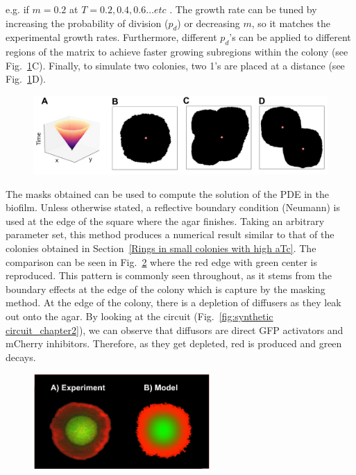 e.g. if $m=0.2$ at $T=0.2, 0.4, 0.6 \ldots etc$ .
The growth rate can be tuned by increasing the probability of division ($p_d$) or decreasing $m$, so it matches the experimental growth rates. Furthermore, different $p_d$’s can be applied to different regions of the matrix to achieve faster growing subregions within the colony (see Fig.~\ref{cas}C). Finally, to simulate two colonies, two 1’s are placed at a distance (see Fig.~\ref{cas}D).

\begin{figure}[H]
    \centering

    \includegraphics[width=1\textwidth]{chapters/Chapter 3/cas}
    \caption{}
    \label{cas}
\end{figure}

The masks obtained can be used to compute the solution of the PDE in the biofilm.
Unless otherwise stated, a reflective boundary condition (Neumann) is used at the edge of the square where the agar finishes.
Taking an arbitrary parameter set, this method produces a numerical result similar to that of the colonies obtained in Section~\ref{Rings in small colonies with high aTc}.
The comparison can be seen in Fig.~\ref{small colony experiment vs model} where the red edge with green center is reproduced.
This pattern is commonly seen throughout, as it stems from the boundary effects at the edge of the colony which is capture by the masking method.
At the edge of the colony, there is a depletion of diffusers as they leak out onto the agar.
By looking at the circuit (Fig.~\ref{fig:synthetic circuit_chapter2}), we can observe that diffusors are direct GFP activators and mCherry inhibitors.
Therefore, as they get depleted, red is produced and green decays.
\begin{figure}[H]
    \centering

    \includegraphics[width=0.6\textwidth]{chapters/Chapter 3/small colony experiment vs model}
    \caption{}
    \label{small colony experiment vs model}
\end{figure}

